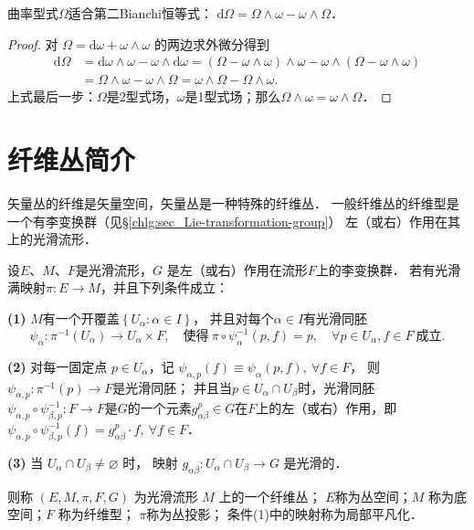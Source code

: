 \begin{theorem}\label{chfb:thm_2ndBianchi}
    曲率型式$\Omega$适合第二Bianchi恒等式：
    $ \mathrm{d} \Omega = \Omega \wedge \omega - \omega \wedge \Omega $．
\end{theorem}
\begin{proof}
对 $\Omega=\mathrm{d} \omega + \omega \wedge \omega$ 的两边求外微分得到
\begin{align*}
    \mathrm{d} \Omega & =\mathrm{d} \omega \wedge \omega- \omega \wedge \mathrm{d} \omega 
     =(\Omega-\omega \wedge \omega) \wedge \omega-\omega \wedge(\Omega-\omega \wedge \omega) \\
    & =\Omega \wedge \omega-\omega \wedge \Omega =\omega \wedge \Omega-\Omega \wedge \omega  .
\end{align*}
上式最后一步：$\Omega$是2型式场，$\omega$是1型式场；那么$\Omega \wedge \omega=\omega \wedge \Omega$．
\end{proof}





\section{纤维丛简介}\label{chfb:sec_fb}
矢量丛的纤维是矢量空间，矢量丛是一种特殊的纤维丛．
一般纤维丛的纤维型是一个有李变换群（见\S\ref{chlg:sec_Lie-transformation-group}）
左（或右）作用在其上的光滑流形．

\begin{definition}\label{chfb:def_fibre-bundles}
    设$E$、$ M$、$ F$是光滑流形，$G$ 是左（或右）作用在流形$F$上的李变换群．
    若有光滑满映射$\pi: E \rightarrow M$，并且下列条件成立：
    
    {\bfseries (1)} $M$有一个开覆盖$\left\{U_\alpha: \alpha \in I\right\}$，
    并且对每个$\alpha \in I$有光滑同胚
    \begin{equation*}
        \psi_\alpha: \pi^{-1}(U_\alpha) \to U_\alpha \times F,
        \quad \text{使得}\ 
        \pi \circ \psi_\alpha^{-1}(p, f)=p, \quad \forall p \in U_\alpha, f \in F 
        \ \text{成立}.
    \end{equation*}
    
    {\bfseries (2)} 对每一固定点 $p \in U_\alpha$，记
    $\psi_{\alpha, p}(f)\equiv \psi_\alpha(p, f), \ \forall f \in F$，
    则 $\psi_{\alpha, p}: \pi^{-1}(p)\to F$是光滑同胚；
    并且当$p \in U_\alpha \cap U_\beta$时，光滑同胚$\psi_{\alpha, p}\circ \psi_{\beta, p}^{-1}:
    F \rightarrow F$是$G$的一个元素$g_{\alpha \beta}^p\in G$在$F$上的左（或右）作用，即
    $\psi_{\alpha, p} \circ \psi_{\beta, p}^{-1}(f)=g^p_{\alpha \beta} \cdot f, 
    \ \forall f \in F$．
    
    
    {\bfseries (3)} 当 $U_\alpha \cap U_\beta \neq \varnothing$ 时，
    映射 $g_{\alpha \beta}: U_\alpha \cap U_\beta \rightarrow G$ 是光滑的．
    
    则称 $(E, M, \pi, F, G)$ 为光滑流形 $M$ 上的一个{\heiti 纤维丛}；
    $E$称为{\heiti 丛空间}；$M$ 称为{\heiti 底空间}；$F$ 称为{\heiti 纤维型}；
    $\pi$称为{\heiti 丛投影}；
    条件(1)中的映射称为{\heiti 局部平凡化}．
\end{definition}


